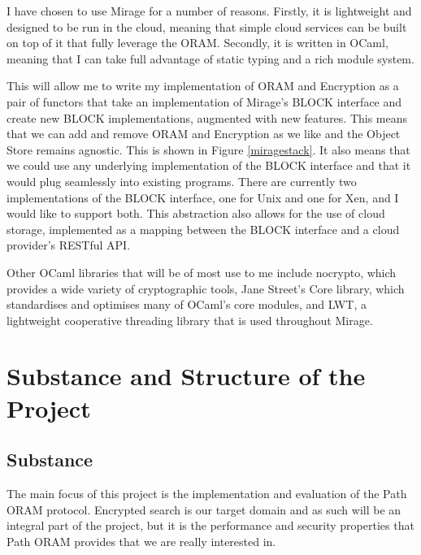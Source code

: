 \documentclass[12pt,a4paper,twoside]{article}
\begin{document}
I have chosen to use Mirage for a number of reasons. Firstly, it is lightweight and designed to be run in the cloud, meaning that simple cloud services can be built on top of it that fully leverage the ORAM. Secondly, it is written in OCaml, meaning that I can take full advantage of static typing and a rich module system. 

This will allow me to write my implementation of ORAM and Encryption as a pair of functors that take an implementation of Mirage's BLOCK interface and create new BLOCK implementations, augmented with new features. This means that we can add and remove ORAM and Encryption as we like and the Object Store remains agnostic. This is shown in Figure \ref{miragestack}. It also means that we could use any underlying implementation of the BLOCK interface and that it would plug seamlessly into existing programs. There are currently two implementations of the BLOCK interface, one for Unix and one for Xen, and I would like to support both. This abstraction also allows for the use of cloud storage, implemented as a mapping between the BLOCK interface and a cloud provider's RESTful API.

Other OCaml libraries that will be of most use to me include nocrypto, which provides a wide variety of cryptographic tools, Jane Street's Core library, which standardises and optimises many of OCaml's core modules, and LWT, a lightweight cooperative threading library that is used throughout Mirage.

\section*{Substance and Structure of the Project}

\subsection*{Substance}


	
	The main focus of this project is the implementation and evaluation of the Path ORAM protocol. Encrypted search is our target domain and as such will be an integral part of the project, but it is the performance and security properties that Path ORAM provides that we are really interested in.
\end{document}
